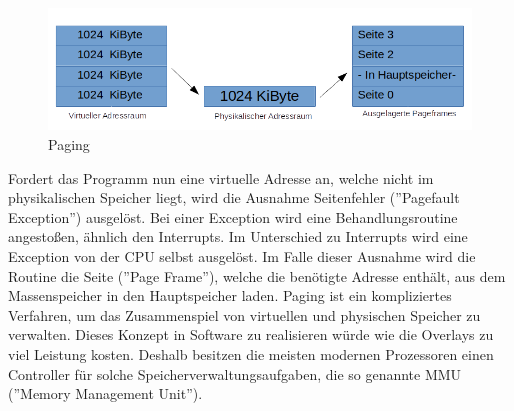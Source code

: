 \documentclass[a4paper,12pt]{article}
\begin{document}
\begin{figure}[!htb]
\includegraphics[scale=0.7]{Paging}
\caption{Paging}
\centering
\label{fig:paging}
\end{figure}

\noindent Fordert das Programm nun eine virtuelle Adresse an, welche nicht im physikalischen Speicher liegt, wird die Ausnahme Seitenfehler (''Pagefault Exception'') ausgelöst. Bei einer Exception wird eine Behandlungsroutine angestoßen, ähnlich den Interrupts. Im Unterschied zu Interrupts wird eine Exception von der CPU selbst ausgelöst. Im Falle dieser Ausnahme wird die Routine die Seite (''Page Frame''), welche die benötigte Adresse enthält, aus dem Massenspeicher in den Hauptspeicher laden. Paging ist ein kompliziertes Verfahren, um das Zusammenspiel von virtuellen und physischen Speicher zu verwalten. Dieses Konzept in Software zu realisieren würde wie die Overlays zu viel Leistung kosten. Deshalb besitzen die meisten modernen Prozessoren einen Controller für solche Speicherverwaltungsaufgaben, die so genannte MMU (''Memory Management Unit''). \cite[S.177ff]{mikroprozessortechnik2011}
\end{document}
